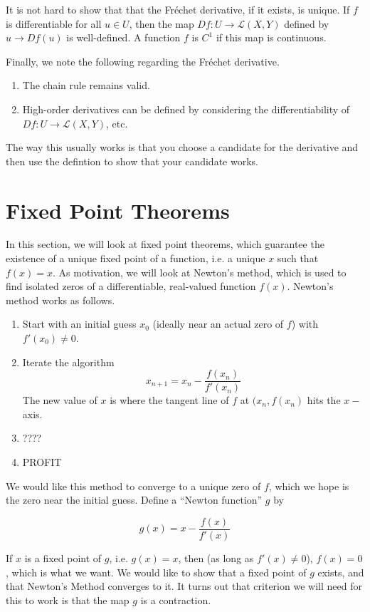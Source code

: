 \documentclass[12pt]{amsart}         %
\theoremstyle{remark}
\begin{document}
It is not hard to show that that the Fr\'{e}chet derivative, if it exists, is unique. If $f$ is differentiable for all $u \in U$, then the map $Df\colon U \rightarrow \mathcal{L}(X,Y)$ defined by $u \rightarrow Df(u)$ is well-defined. A function $f$ is $C^1$ if this map is continuous.

Finally, we note the following regarding the Fr\'{e}chet derivative.

\begin{enumerate}
    \item The chain rule remains valid.
    \item High-order derivatives can be defined by considering the differentiability of $Df: U \rightarrow \mathcal{L}(X,Y)$, etc.
\end{enumerate}

The way this usually works is that you choose a candidate for the derivative and then use the defintion to show that your candidate works.

\section{Fixed Point Theorems}

In this section, we will look at fixed point theorems, which guarantee the existence of a unique fixed point of a function, i.e. a unique $x$ such that $f(x) = x$. As motivation, we will look at Newton's method, which is used to find isolated zeros of a differentiable, real-valued function $f(x)$. Newton's method works as follows.

\begin{enumerate}
\item Start with an initial guess $x_0$ (ideally near an actual zero of $f$) with $f'(x_0) \neq 0$.
\item Iterate the algorithm 
\[
x_{n+1} = x_n - \frac{f(x_n)}{f'(x_n)}
\]
The new value of $x$ is where the tangent line of $f$ at $(x_n, f(x_n)$ hits the $x-$axis.
\item ????
\item PROFIT
\end{enumerate}

We would like this method to converge to a unique zero of $f$, which we hope is the zero near the initial guess. Define a ``Newton function'' $g$ by

\[
g(x) = x - \frac{f(x)}{f'(x)}
\]

If $x$ is a fixed point of $g$, i.e. $g(x) = x$, then (as long as $f'(x) \neq 0$), $f(x) = 0$, which is what we want. We would like to show that a fixed point of $g$ exists, and that Newton's Method converges to it. It turns out that criterion we will need for this to work is that the map $g$ is a contraction.
\end{document}
